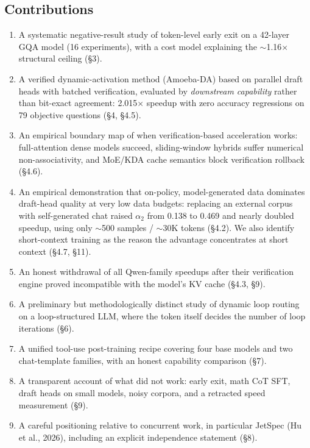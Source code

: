 \documentclass[11pt,a4paper]{article}
\begin{document}
\subsection{Contributions}
\begin{enumerate}[leftmargin=*]
  \item A systematic negative-result study of token-level early exit on a 42-layer GQA model
        (16 experiments), with a cost model explaining the $\sim$1.16$\times$ structural ceiling (\S3).
  \item A verified dynamic-activation method (Amoeba-DA) based on parallel draft heads with
        batched verification, evaluated by \emph{downstream capability} rather than bit-exact
        agreement: 2.015$\times$ speedup with zero accuracy regressions on 79 objective
        questions (\S4, \S4.5).
  \item An empirical boundary map of when verification-based acceleration works: full-attention
        dense models succeed, sliding-window hybrids suffer numerical non-associativity, and
        MoE/KDA cache semantics block verification rollback (\S4.6).
  \item An empirical demonstration that on-policy, model-generated data dominates draft-head
        quality at very low data budgets: replacing an external corpus with self-generated chat
        raised $\alpha_2$ from 0.138 to 0.469 and nearly doubled speedup, using only
        $\sim$500 samples / $\sim$30K tokens (\S4.2). We also identify short-context training
        as the reason the advantage concentrates at short context (\S4.7, \S11).
  \item An honest withdrawal of all Qwen-family speedups after their verification engine proved
        incompatible with the model's KV cache (\S4.3, \S9).
  \item A preliminary but methodologically distinct study of dynamic loop routing on a
        loop-structured LLM, where the token itself decides the number of loop iterations (\S6).
  \item A unified tool-use post-training recipe covering four base models and two chat-template
        families, with an honest capability comparison (\S7).
  \item A transparent account of what did not work: early exit, math CoT SFT, draft heads on
        small models, noisy corpora, and a retracted speed measurement (\S9).
  \item A careful positioning relative to concurrent work, in particular JetSpec (Hu et al.,
        2026), including an explicit independence statement (\S8).
\end{enumerate}
\end{document}
